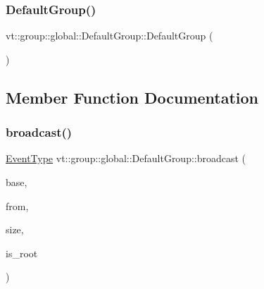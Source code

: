 \subsubsection{\texorpdfstring{Default\+Group()}{DefaultGroup()}}
{\footnotesize\ttfamily vt\+::group\+::global\+::\+Default\+Group\+::\+Default\+Group (\begin{DoxyParamCaption}{ }\end{DoxyParamCaption})\hspace{0.3cm}{\ttfamily [default]}}



\subsection{Member Function Documentation}
\mbox{\label{structvt_1_1group_1_1global_1_1_default_group_a473b19ec41ee9fe654645405a313cca4}} 
\subsubsection{\texorpdfstring{broadcast()}{broadcast()}}
{\footnotesize\ttfamily \hyperlink{namespacevt_a009267401def7ae8bf201892222d060f}{Event\+Type} vt\+::group\+::global\+::\+Default\+Group\+::broadcast (\begin{DoxyParamCaption}\item[{\hyperlink{namespacevt_ab2b3d506ec8e8d1540aede826d84a239}{Msg\+Shared\+Ptr}$<$ \hyperlink{namespacevt_a44d0d4e144748f2b19a1cfd962f50338}{Base\+Msg\+Type} $>$ const \&}]{base,  }\item[{\hyperlink{namespacevt_a866da9d0efc19c0a1ce79e9e492f47e2}{Node\+Type} const \&}]{from,  }\item[{\hyperlink{namespacevt_abfa009d900299ac1df967b40ea8f2c8a}{Msg\+Size\+Type} const \&}]{size,  }\item[{bool const}]{is\+\_\+root }\end{DoxyParamCaption})\hspace{0.3cm}{\ttfamily [static]}}

\mbox{\label{structvt_1_1group_1_1global_1_1_default_group_a2f503c7d6615e558ce08b0de7a1e8bfa}} 
